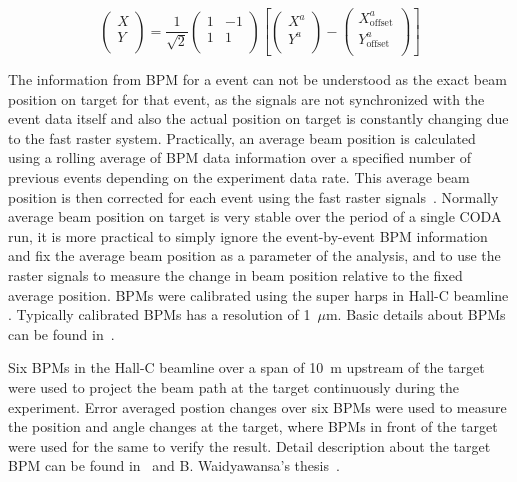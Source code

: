 \begin{equation} \label{equ:bpm3}
\left( \begin{array}{c}
X \\
Y \\
\end{array} \right)
=
\frac{1}{\sqrt{2}}
\left( \begin{array}{cc}
1 & -1\\
1 & 1\\
\end{array} \right)
\left[\left( \begin{array}{c}
X^{a} \\
Y^{a} \\
\end{array} \right)
-
\left( \begin{array}{c}
X^{a}_{\textrm{offset}} \\
Y^{a}_{\textrm{offset}} \\
\end{array} \right)\right]
\end{equation}

The information from BPM for a event can not be understood as the exact beam position on target for that event, as the signals are not synchronized with the event data itself and also the actual position on target is constantly changing due to the fast raster system. Practically, an average beam position is calculated using a rolling average of BPM data information over a specified number of previous events depending on the experiment data rate. This average beam position is then corrected for each event using the fast raster signals~\cite{puckett_GEPIII}. Normally average beam position on target is very stable over the period of a single CODA run, it is more practical to simply ignore the event-by-event BPM information and fix the average beam position as a parameter of the analysis, and to use the raster signals to measure the change in beam position relative to the fixed average position. BPMs were calibrated using the super harps in Hall-C beamline \cite{hauger_polarimeter}. Typically calibrated BPMs has a resolution of 1~$\mu$m. 
Basic details about BPMs can be found in~\cite{bpm2}.

Six BPMs in the Hall-C beamline over a span of 10~m upstream of the target were used to project the beam path at the target continuously during the experiment. Error averaged postion changes over six BPMs were used to measure the position and angle changes at the target, where BPMs in front of the target were used for the same to verify the result. Detail description about the target BPM can be found in~\cite{nur_linear_reg, leo_book} and B. Waidyawansa's thesis~\cite{buddhini_qweak}.


